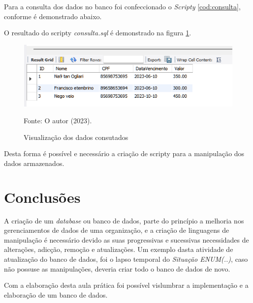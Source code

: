 \par Para a consulta dos dados no banco foi confeccionado o \textit{Scripty} \autoref{cod:consulta}, conforme é demonstrado abaixo.



\par O resultado do scripty \textit{consulta.sql} é demonstrado na figura \ref{fig:view}.

\begin{figure}[h!]
\caption{Visualização dos dados consutados}
\begin{center}
   \includegraphics[scale=1]{figure/view.png}
\end{center}
\label{fig:view}
{\fontsize{10pt}{\baselineskip}\selectfont
Fonte: O autor (2023).}
\end{figure}

\par Desta forma é possível e necessário a criação de scripty para a manipulação dos dados armazenados.


\section{Conclusões}
\par A criação de um \textit{database} ou banco de dados, parte do princípio a melhoria nos gerenciamentos de dados de uma organização, e a criação de linguagens de manipulação é necessário devido as suas progressivas e sucessivas necessidades de alterações, adicção, remoção e atualizações. Um exemplo dasta atividade de atualização do banco de dados, foi o lapso temporal do \textit{Situação ENUM(..)}, caso não possuse as manipulações, deveria criar todo o banco de dados de novo.
\par Com a elaboração desta aula prática foi possível vislumbrar a implementação e a elaboração de um banco de dados.
